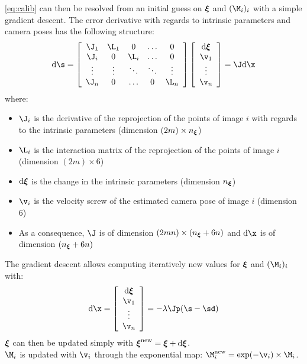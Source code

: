 \documentclass{ecnreport}
\begin{document}
\eqref{eq:calib} can then be resolved from an initial guess on ${\boldsymbol{\xi}}$ and $(\M_i)_i$ with a simple gradient descent. 
The error derivative with regards to intrinsic parameters and camera poses has the following structure:
\newcommand{\der}{\text{d}}
\begin{equation}\label{eq:jacob}
 \der\s =  \left[\begin{array}{ccccc}
           \J_1 & \L_1 &  0 &  \hdots & 0 \\ 
           \J_i & 0 & \L_i &  \hdots & 0 \\
           \vdots& \vdots & \ddots & \ddots & \vdots\\
           \J_n & 0 & \hdots & 0 & \L_n
            \end{array}\right]
            \left[\begin{array}{c}\der\xii \\ \v_1 \\ \vdots \\ \v_n\end{array}\right]
             = \J\der\x
\end{equation}
where:
\begin{itemize}
\item $\J_i$ is the derivative of the reprojection of the points of image $i$ with regards to the intrinsic parameters (dimension $(2m)\times n_{\boldsymbol{\xi}}$)
 \item $\L_i$ is the interaction matrix of the reprojection of the points of image $i$ (dimension $(2m)\times 6$)
 \item $\der\xii$ is the change in the intrinsic parameters (dimension $n_{\boldsymbol{\xi}}$) 
 \item $\v_i$ is the velocity screw of the estimated camera pose of image $i$ (dimension $6$)
 \item As a consequence, $\J$ is of dimension $(2mn)\times (n_{\boldsymbol{\xi}}+6n)$ and $\der\x$ is of dimension  $(n_{\boldsymbol{\xi}}+6n)$
\end{itemize}
The gradient descent allows computing iteratively new values for ${\boldsymbol{\xi}}$ and $(\M_i)_i$ with:
\begin{equation}
 \der\x = \left[\begin{array}{c}\der\xii \\ \v_1 \\ \vdots \\ \v_n\end{array}\right] = -\lambda\Jp(\s - \sd)
\end{equation}
${\boldsymbol{\xi}}$ can then be updated simply with $\xii^{\text{new}} = \xii + \der\xii$.\\
$\M_i$ is updated with $\v_i$ through the exponential map: $\M_i^{\text{new}} = \exp(-\v_i)\times\M_i$.\\
\end{document}
